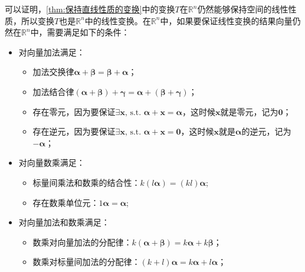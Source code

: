 可以证明，\ref{thm:保持直线性质的变换}中的变换$T$在$\mathbb{R}^n$仍然能够保持空间的线性性质，所以变换$T$也是$\mathbb{R}^n$中的线性变换。在$\mathbb{R}^n$中，如果要保证线性变换的结果向量仍然在$\mathbb{R}^n$中，需要满足如下的条件：
\begin{itemize}
    \item 对向量加法满足：
    \begin{itemize}
        \item 加法交换律$\boldsymbol{\alpha}+\boldsymbol{\beta} = \boldsymbol{\beta}+\boldsymbol{\alpha}$；
        \item 加法结合律$(\boldsymbol{\alpha}+\boldsymbol{\beta})+\boldsymbol{\gamma}=\boldsymbol{\alpha}+(\boldsymbol{\beta}+\boldsymbol{\gamma})$；
        \item 存在零元，因为要保证$\exists \boldsymbol{x}\text{, s.t. } \boldsymbol{\alpha}+\boldsymbol{x}=\boldsymbol{\alpha}$，这时候$\boldsymbol{x}$就是零元，记为$\boldsymbol{0}$；
        \item 存在逆元，因为要保证$\exists \boldsymbol{x}\text{, s.t. } \boldsymbol{\alpha}+\boldsymbol{x}=\boldsymbol{0}$，这时候$\boldsymbol{x}$就是$\boldsymbol{\alpha}$的逆元，记为$-\boldsymbol{\alpha}$；
    \end{itemize}
    \item 对向量数乘满足：
    \begin{itemize}
        \item 标量间乘法和数乘的结合性：$k(l\boldsymbol{\alpha}) = (kl)\boldsymbol{\alpha}$;
        \item 存在数乘单位元：$1 \boldsymbol{\alpha} = \boldsymbol{\alpha}$;
    \end{itemize}
    \item 对向量加法和数乘满足：
    \begin{itemize}
        \item 数乘对向量加法的分配律：$k(\boldsymbol{\alpha} + \boldsymbol{\beta}) = k\boldsymbol{\alpha} + k\boldsymbol{\beta}$；
        \item 数乘对标量间加法的分配律：$(k+l)\boldsymbol{\alpha} = k\boldsymbol{\alpha} + l\boldsymbol{\alpha}$；
    \end{itemize}
\end{itemize}



